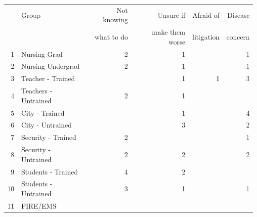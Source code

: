 \documentclass{article}
\begin{document}
\begin{table}[h]
\centering
\begin{tabular}{rlrrrr}
  \hline
 & Group & Not knowing & Unsure if & Afraid of & Disease \\
 &  & what to do & make them worse & litigation & concern \\
  \hline
1 & Nursing Grad &   2 &   1 &  &   1 \\
  2 & Nursing Undergrad &   2 &   1 &  &   1 \\
  3 & Teacher - Trained &  &   1 &   1 &   3 \\
  4 & Teachers - Untrained &   2 &   1 &  &  \\
  5 & City - Trained &  &   1 &  &   4 \\
  6 & City - Untrained &  &   3 &  &   2 \\
  7 & Security - Trained &   2 &  &  &   1 \\
  8 & Security - Untrained &   2 &   2 &  &   2 \\
  9 & Students - Trained &   4 &   2 &  &  \\
  10 & Students - Untrained &   3 &   1 &  &   1 \\
  11 & FIRE/EMS &  &  &  &  \\
   \hline
\end{tabular}
\end{table}

\pagebreak
\end{document}
